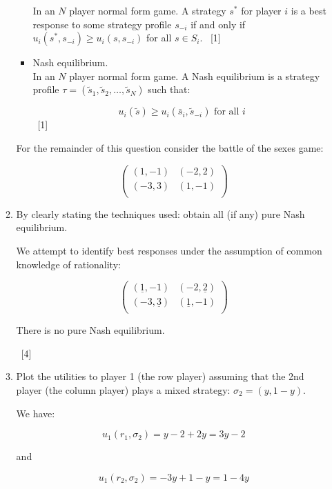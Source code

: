 \documentclass[12pt,a4paper]{article}
\begin{document}
\begin{enumerate}
\begin{enumerate}
\begin{itemize}
                In an $N$ player normal form game. A strategy $s^*$ for player $i$ is a best response to some strategy profile $s_{-i}$ if and only if $u_i(s^*,s_{-i})\geq u_{i}(s,s_{-i})$ for all $s\in S_i$.
                ~\hfill{[1]}

                \item Nash equilibrium.\\

                In an $N$ player normal form game. A Nash equilibrium is a strategy profile $\tau = (\tilde s_1,\tilde s_2,\dots,\tilde s_N)$ such that:

                $$u_i(\tilde s)\geq u_i(\bar s_i,\tilde s_{-i})\text{ for all }i$$
                ~\hfill{[1]}
            \end{itemize}

        For the remainder of this question consider the battle of the sexes game:

            \[\begin{pmatrix}
            (1,-1) & (-2,2)\\
            (-3,3) & (1,-1)\\
            \end{pmatrix}\]

        \item By clearly stating the techniques used: obtain all (if any) pure Nash equilibrium.

            We attempt to identify best responses under the assumption of common knowledge of rationality:

            \[\begin{pmatrix}
            (\underline{1},-1) & (-2,\underline{2})\\
            (-3,\underline{3}) & (\underline{1},-1)\\
            \end{pmatrix}\]

            There is no pure Nash equilibrium.

        ~\hfill{[4]}

        \item Plot the utilities to player 1 (the row player) assuming that the 2nd player (the column player) plays a mixed strategy: $\sigma_2 = (y,1-y)$.

        We have:

        $$u_1(r_1,\sigma_2)=y-2+2y=3y-2$$

        and

        $$u_1(r_2,\sigma_2)=-3y+1-y=1-4y$$


\end{enumerate}
\end{enumerate}
\end{document}
